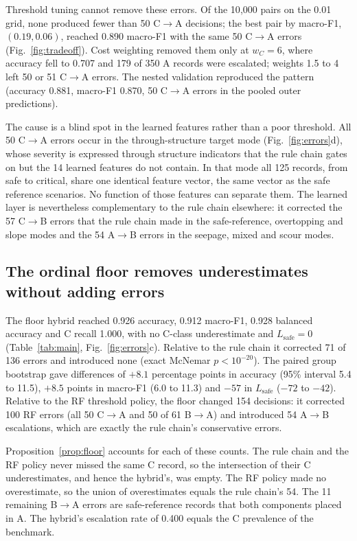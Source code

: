 \documentclass[journal]{IEEEtran}
\newcommand{\CtoA}{C$\rightarrow$A}
\newcommand{\CtoB}{C$\rightarrow$B}
\newcommand{\BtoA}{B$\rightarrow$A}
\newcommand{\AtoB}{A$\rightarrow$B}
\newcommand{\Lsafe}{L_{\mathrm{safe}}}
\begin{document}
Threshold tuning cannot remove these errors. Of the 10{,}000 pairs on the 0.01 grid, none produced fewer than 50 \CtoA{} decisions; the best pair by macro-F1, $(0.19,0.06)$, reached 0.890 macro-F1 with the same 50 \CtoA{} errors (Fig.~\ref{fig:tradeoff}). Cost weighting removed them only at $w_C=6$, where accuracy fell to 0.707 and 179 of 350 A records were escalated; weights 1.5 to 4 left 50 or 51 \CtoA{} errors. The nested validation reproduced the pattern (accuracy 0.881, macro-F1 0.870, 50 \CtoA{} errors in the pooled outer predictions).

The cause is a blind spot in the learned features rather than a poor threshold. All 50 \CtoA{} errors occur in the through-structure target mode (Fig.~\ref{fig:errors}d), whose severity is expressed through structure indicators that the rule chain gates on but the 14 learned features do not contain. In that mode all 125 records, from safe to critical, share one identical feature vector, the same vector as the safe reference scenarios. No function of those features can separate them. The learned layer is nevertheless complementary to the rule chain elsewhere: it corrected the 57 \CtoB{} errors that the rule chain made in the safe-reference, overtopping and slope modes and the 54 \AtoB{} errors in the seepage, mixed and scour modes.

\subsection{The ordinal floor removes underestimates without adding errors}
\label{sec:res-floor}
The floor hybrid reached 0.926 accuracy, 0.912 macro-F1, 0.928 balanced accuracy and C recall 1.000, with no C-class underestimate and $\Lsafe=0$ (Table~\ref{tab:main}, Fig.~\ref{fig:errors}c). Relative to the rule chain it corrected 71 of 136 errors and introduced none (exact McNemar $p<10^{-20}$). The paired group bootstrap gave differences of $+8.1$ percentage points in accuracy (95\% interval 5.4 to 11.5), $+8.5$ points in macro-F1 (6.0 to 11.3) and $-57$ in $\Lsafe$ ($-72$ to $-42$). Relative to the RF threshold policy, the floor changed 154 decisions: it corrected 100 RF errors (all 50 \CtoA{} and 50 of 61 \BtoA) and introduced 54 \AtoB{} escalations, which are exactly the rule chain's conservative errors.

Proposition~\ref{prop:floor} accounts for each of these counts. The rule chain and the RF policy never missed the same C record, so the intersection of their C underestimates, and hence the hybrid's, was empty. The RF policy made no overestimate, so the union of overestimates equals the rule chain's 54. The 11 remaining \BtoA{} errors are safe-reference records that both components placed in A. The hybrid's escalation rate of 0.400 equals the C prevalence of the benchmark.
\end{document}
